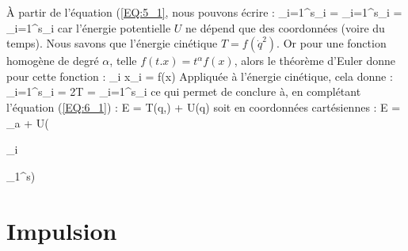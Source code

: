 \`A partir de l'\'equation (\ref{EQ:5_1}, nous pouvons \'ecrire :
\be
	\sum_{i=1}^{s}_{i} = \sum_{i=1}^{s}_{i} = \sum_{i=1}^{s}_{i}
\ee
car l'\'energie potentielle $U$ ne d\'epend que des coordonn\'ees (voire du temps).
Nous savons que l'\'energie cin\'etique $T = f(\dot{q}^{2})$. Or pour une fonction homog\`ene de degr\'e $\alpha$, telle $f(t.x) = t^{\alpha}f(x)$, alors le th\'eor\`eme d'Euler donne pour cette fonction :
\be
	\sum_{i} x_{i} = \alpha f(x)
\ee
Appliqu\'ee \`a l'\'energie cin\'etique, cela donne :
\be
	\sum_{i=1}^{s}_{i} = 2T = \sum_{i=1}^{s}_{i}
\ee
ce qui permet de conclure \`a, en compl\'etant l'\'equation (\ref{EQ:6_1}) :
\be
	E = T(q,) + U(q) \label{EQ:6_2}
\ee
soit en coordonn\'ees cart\'esiennes :
\be
	E = \sum_{a} + U(\begin{Bmatrix}_{i}\end{Bmatrix}_{1}^{s}) \label{EQ:6_3}
\ee

\section{Impulsion}

